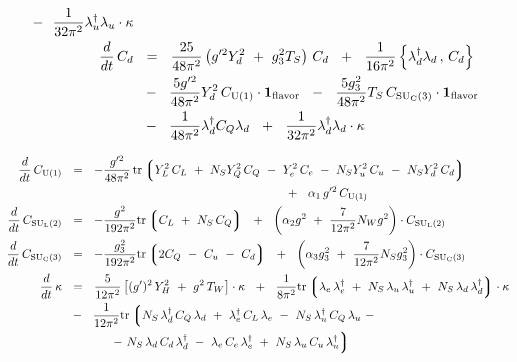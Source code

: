 \documentclass[12pt]{revtex4}
\newcommand{\suc}{{{\rm SU}_{\rm C}(3)}}
\newcommand{\sul}{{{\rm SU}_{\rm L}(2)}}
\newcommand{\ue}{{{\rm U}(1)}}
\newcommand{\uflavor}{\mathbf{1}_{\rm flavor}}
\newcommand{\lgr}{\left\lgroup}
\newcommand{\rgr}{\right\rgroup}
\begin{document}
\begin{align}
	~~-~~
	\frac{1}{32\pi^2}
	\lambda_u^\dag \lambda_u \cdot
	\kappa
	\\
\notag
	\frac{d}{dt}\, 
	C_d
	&
	~~=~~
	\frac{25}{48\pi^2} 
	\left( g'^2 Y_d^2 ~+~ g_3^2 T_S 
	\right)\, C_d
	~~+~~
	\frac{1}{16\pi^2} 
	\left\{ \lambda_d^\dag \lambda_d \,,\, C_d 
	\right\}
	\\
\notag
	&
	~~-~~
	\frac{5 g'^2}{48\pi^2} Y_d^2 \, C_\ue \cdot \uflavor
	~~-~~
	\frac{5 g_3^2}{48\pi^2} T_S \, C_\suc \cdot \uflavor
	\\
\notag
	&
	~~-~~
	\frac{1}{48\pi^2} \lambda_d^\dag C_Q \lambda_d 
	~~+~~
	\frac{1}{32\pi^2} \lambda_d^\dag \lambda_d \cdot
	\kappa
\end{align}

\begin{align}
\notag
	\frac{d}{dt}\, 
	C_\ue 
	&
	~~=~~
	- \frac{g'^2}{48\pi^2}\,
	{\rm tr} 
	\lgr
		Y_L^2\, C_L ~+~ N_S Y_Q^2\, C_Q ~-~
		Y_e^2\, C_e ~-~ 
		N_S Y_u^2\, C_u ~-~ N_S Y_d^2\, C_d
	\rgr
	\\
\notag
	&
	\qquad\qquad\qquad\qquad\qquad\qquad\qquad\qquad\qquad
	~~+~~
	\alpha_1 \, g'^2 \, C_\ue
	\\
\notag
	\frac{d}{dt}\, 
	C_\sul 
	&
	~~=~~
	- \frac{g^2}{192\pi^2} {\rm tr} \lgr C_L ~+~ N_S \, C_Q \rgr
	~~+~~
	\left(
		\alpha_2 g^2 ~+~
		\frac{7}{12\pi^2}N_W g^2 
	\right) \cdot
	C_\sul
	\\
\notag
	\frac{d}{dt}\, 
	C_\suc
	&
	~~=~~
	- \frac{g_3^2}{192\pi^2} 
	{\rm tr} \lgr
		2 C_Q ~-~ C_u ~-~ C_d 
		\rgr
	~~+~~
	\left(
		\alpha_3 g_3^2 ~+~
		\frac{7}{12\pi^2} N_S g_3^2
	\right) \cdot
	C_\suc
	\\
\notag
	\frac{d}{dt}\, 
	\kappa
	&
	~~=~~
	\frac{5}{12\pi^2} 
	\left[
		(g')^2\, Y_H^2 ~+~ g^2\, T_W
	\right] \cdot \kappa
	~~+~~
	\frac{1}{8\pi^2}
	{\rm tr}
	\lgr
		\lambda_e\, \lambda_e^\dag
		~+~
		N_S\, \lambda_u\, \lambda_u^\dag
		~+~
		N_S\, \lambda_d\, \lambda_d^\dag
	\rgr
	\cdot \kappa
	\\
\notag
	&
	~~-~~
	\frac{1}{12\pi^2}
	{\rm tr} 
	\lgr
		N_S\, \lambda_d^\dag\, C_Q\, \lambda_d 
		~+~
		\lambda_e^\dag\, C_L\, \lambda_e
		~-~
		N_S\, \lambda_u^\dag\, C_Q\, \lambda_u
		~-
	\right.
	\\
\notag
	&
	\qquad\qquad
	\left.
		-~
		N_S\, \lambda_d\, C_d\, \lambda_d^\dag
		~-~
		\lambda_e\, C_e\, \lambda_e^\dag
		~+~
		N_S\, \lambda_u\, C_u\, \lambda_u^\dag
	\rgr
\end{align}
\end{document}
